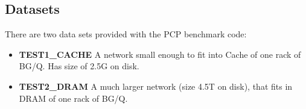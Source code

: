\subsection{Datasets}
There are two data sets provided with the PCP benchmark code:
\begin{itemize}
    \item \textbf{TEST1\_CACHE} A network small enough to fit into Cache of one rack of BG/Q. Has size of 2.5G on disk.
    \item \textbf{TEST2\_DRAM} A much larger network (size 4.5T on disk), that fits in DRAM of one rack of BG/Q.
\end{itemize}


